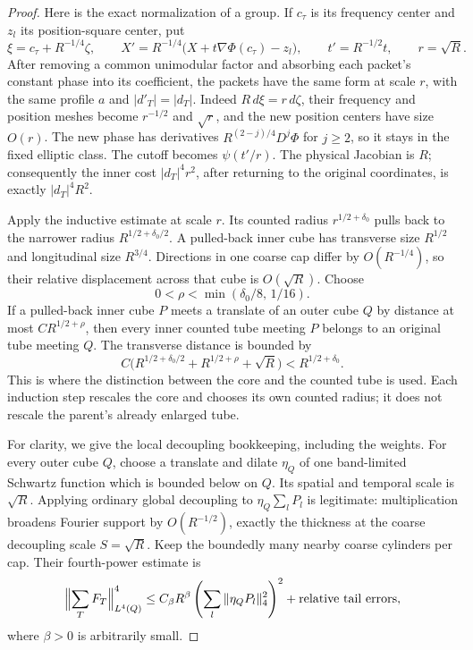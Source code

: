 \begin{proof}
Here is the exact normalization of a group. If \(c_\tau\) is its
frequency center and \(z_l\) its position-square center, put
\[
 \xi=c_\tau+R^{-1/4}\zeta,\qquad
 X'=R^{-1/4}\bigl(X+t\nabla\Phi(c_\tau)-z_l\bigr),\qquad
 t'=R^{-1/2}t,\qquad r=\sqrt R.
\]
After removing a common unimodular factor and absorbing each
packet's constant phase into its coefficient, the packets have the
same form at scale \(r\), with the same profile \(a\) and
\(|d'_T|=|d_T|\). Indeed
\(R\,d\xi=r\,d\zeta\), their frequency and position meshes become
\(r^{-1/2}\) and \(\sqrt r\), and the new position centers have size
\(O(r)\). The new phase has derivatives
\(R^{(2-j)/4}D^j\Phi\) for \(j\ge2\), so it stays in the fixed
elliptic class. The cutoff becomes \(\psi(t'/r)\).
The physical Jacobian is \(R\); consequently the inner cost
\(|d_T|^4r^2\), after returning to the original coordinates, is
exactly \(|d_T|^4R^2\).

Apply the inductive estimate at scale \(r\). Its counted radius
\(r^{1/2+\delta_0}\) pulls back to the narrower radius
\(R^{1/2+\delta_0/2}\). A pulled-back inner cube has transverse
size \(R^{1/2}\) and longitudinal size \(R^{3/4}\). Directions in
one coarse cap differ by \(O(R^{-1/4})\), so their relative
displacement across that cube is \(O(\sqrt R)\).
Choose
\[
 0<\rho<\min(\delta_0/8,\,1/16).
\]
If a pulled-back inner cube \(P\) meets a translate of an outer cube
\(Q\) by distance at most \(C R^{1/2+\rho}\), then every inner counted
tube meeting \(P\) belongs to an original tube meeting \(Q\). The
transverse distance is bounded by
\[
 C\bigl(R^{1/2+\delta_0/2}+R^{1/2+\rho}+\sqrt R\bigr)
                                  <R^{1/2+\delta_0}.
\]
This is where the distinction between the core and the counted tube
is used. Each induction step rescales the core and chooses its own
counted radius; it does not rescale the parent's already enlarged tube.

For clarity, we give the local decoupling bookkeeping, including the
weights. For every outer cube \(Q\), choose a translate and dilate
\(\eta_Q\) of one band-limited Schwartz function which is bounded
below on \(Q\). Its spatial and temporal scale is \(\sqrt R\).
Applying ordinary global decoupling to
\(\eta_Q\sum_lP_l\) is legitimate: multiplication broadens Fourier
support by \(O(R^{-1/2})\), exactly the thickness at the coarse
decoupling scale \(S=\sqrt R\). Keep the boundedly many nearby
coarse cylinders per cap. Their fourth-power estimate is
\[
 \Bigl\|\sum_TF_T\Bigr\|_{L^4(Q)}^4
 \le C_\beta R^\beta
       \left(\sum_l\|\eta_QP_l\|_4^2\right)^2
       +\text{relative tail errors},
\]
where \(\beta>0\) is arbitrarily small.


\end{proof}
